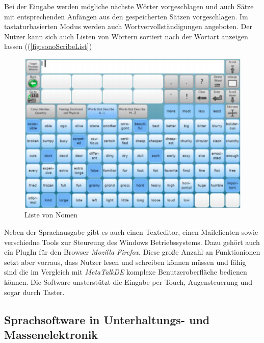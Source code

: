             Bei der Eingabe werden mögliche nächste Wörter vorgeschlagen und auch Sätze mit entsprechenden Anfängen aus den gespeicherten Sätzen vorgeschlagen. Im tastaturbasierten Modus werden auch Wortvervollständigungen angeboten. Der Nutzer kann sich auch Listen von Wörtern sortiert nach der Wortart anzeigen lassen ((\autoref{fig:sonoScribeList})
            
            \begin{figure}[H]
  				\centering
  				\includegraphics[width=.5\linewidth]{images/SonoScribeList.png}
  				\caption{Liste von Nomen \parencite[S. 18]{tobii:sonoScribeManual}}
                \label{fig:sonoScribeList}
			\end{figure}
            
			Neben der Sprachausgabe gibt es auch einen Texteditor, einen Mailclienten sowie verschiedne Tools zur Steureung des Windows Betriebssystems. Dazu gehört auch ein PlugIn für den Browser \emph{Mozilla Firefox}. Diese große Anzahl an Funktionionen setzt aber vorraus, dass Nutzer lesen und schreiben können müssen und fähig sind die im Vergleich mit \emph{MetaTalkDE} komplexe Benutzeroberfläche bedienen können. Die Software unsterstützt die Eingabe per Touch, Augensteuerung und sogar durch Taster. 
    
	\subsection{Sprachsoftware in Unterhaltungs- und Massenelektronik}
    
    \newpage